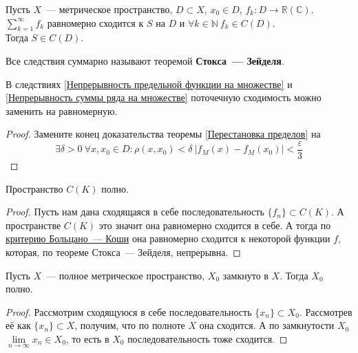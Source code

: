 \documentclass{article}
\let\eps\varepsilon
\begin{document}
    \begin{corollary}
        \label{Непрерывность суммы ряда на множестве}
        Пусть $X$~--- метрическое пространство, $D\subset X$, $x_0\in D$, $f_k\colon D\to\mathbb R(\mathbb C)$.\\
        $\sum\limits_{k=1}^\infty f_k$ равномерно сходится к $S$ на $D$ и $\forall k\in\mathbb N~f_k\in C(D)$.\\
        Тогда $S\in C(D)$.
    \end{corollary}
    \begin{remark}
        Все следствия суммарно называют теоремой \textbf{Стокса~--- Зейделя}.
    \end{remark}
    \begin{claim}
        В следствиях \ref{Непрерывность предельной функции на множестве} и \ref{Непрерывность суммы ряда на множестве} поточечную сходимость можно заменить на равномерную.
    \end{claim}
    \begin{proof}
        Замените конец доказательства теоремы \ref{Перестановка пределов} на
        $$
        \exists\delta>0~\forall x,x_0\in D:\rho(x,x_0)<\delta~|f_M(x)-f_M(x_0)|<\frac\eps3
        $$
    \end{proof}
    \begin{theorem}
        \label{Полнота C(K)}
        Пространство $C(K)$ полно.
    \end{theorem}
    \begin{proof}
        Пусть нам дана сходящаяся в себе последовательность $\{f_n\}\subset C(K)$. А пространстве $C(K)$ это значит она равномерно сходится в себе. А тогда по \hyperref[Б-К для функциональных последовательностей]{критерию Больцано~--- Коши} она равномерно сходится к некоторой функции $f$, которая, по теореме Стокса~--- Зейделя, непрерывна.
    \end{proof}
    \begin{lemma}
        Пусть $X$~--- полное метрическое пространство, $X_0$ замкнуто в $X$. Тогда $X_0$ полно.
    \end{lemma}
    \begin{proof}
        Рассмотрим сходящуюся в себе последовательность $\{x_n\}\subset X_0$. Рассмотрев её как $\{x_n\}\subset X$, получим, что по полноте $X$ она сходится. А по замкнутости $X_0$ $\lim\limits_{n\to\infty}x_n\in X_0$, то есть в $X_0$ последовательность тоже сходится.
    \end{proof}
\end{document}
